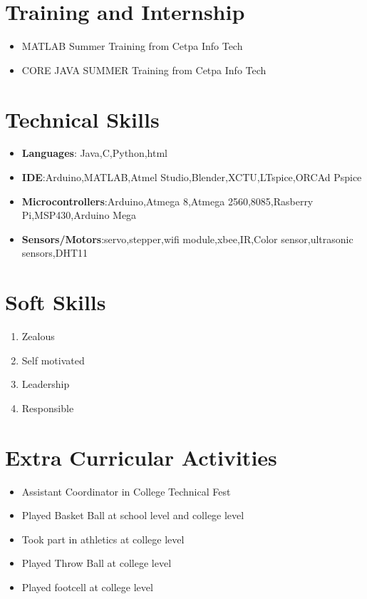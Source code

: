 \documentclass[11pt]{article}
\begin{document}
\section{Training and Internship}
\begin{itemize}
 \item MATLAB Summer Training from Cetpa Info Tech
 \item CORE JAVA SUMMER Training from Cetpa Info Tech
 
\end{itemize}
\newpage
\section{Technical Skills}
\begin{itemize}
\item\textbf{ Languages}: Java,C,Python,html
\item\textbf {IDE}:Arduino,MATLAB,Atmel Studio,Blender,XCTU,LTspice,ORCAd Pspice
 \item\textbf{ Microcontrollers}:Arduino,Atmega 8,Atmega 2560,8085,Rasberry Pi,MSP430,Arduino Mega
\item\textbf{ Sensors/Motors}:servo,stepper,wifi module,xbee,IR,Color sensor,ultrasonic sensors,DHT11
 \end{itemize}
\section{Soft Skills}
\begin{enumerate}
\item Zealous
\item Self motivated
\item Leadership
\item Responsible
\end{enumerate}
\section{Extra Curricular Activities}
\begin{itemize}
\item Assistant Coordinator in College Technical Fest
\item Played Basket Ball at school level and college level
\item Took part in athletics at college level
\item Played Throw Ball at college level
\item Played footcell at college level \\
\end{itemize}
\end{document}
